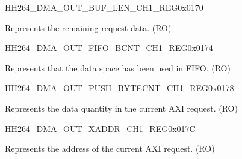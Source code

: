     \begin{register}{H}{H264\_DMA\_OUT\_BUF\_LEN\_CH1\_REG}{0x0170}\label{regdesc:H264DMAOUTBUFLENCH1REG}
    \regnewline%
    \begin{regdesc}\begin{reglist}
    \label{fielddesc:H264DMAOUTCMDFIFOBUFLENHBCH1}\item [H264\_DMA\_OUT\_CMDFIFO\_BUF\_LEN\_HB\_CH1] Represents the remaining request data. (RO)
    \end{reglist}\end{regdesc}
    \end{register}
    
    
    \begin{register}{H}{H264\_DMA\_OUT\_FIFO\_BCNT\_CH1\_REG}{0x0174}\label{regdesc:H264DMAOUTFIFOBCNTCH1REG}
    \regnewline%
    \begin{regdesc}\begin{reglist}
    \label{fielddesc:H264DMAOUTCMDFIFOOUTFIFOBCNTCH1}\item [H264\_DMA\_OUT\_CMDFIFO\_OUTFIFO\_BCNT\_CH1] Represents that the data space has been used in FIFO. (RO)
    \end{reglist}\end{regdesc}
    \end{register}
    
    
    \begin{register}{H}{H264\_DMA\_OUT\_PUSH\_BYTECNT\_CH1\_REG}{0x0178}\label{regdesc:H264DMAOUTPUSHBYTECNTCH1REG}
    \regnewline%
    \begin{regdesc}\begin{reglist}
    \label{fielddesc:H264DMAOUTCMDFIFOPUSHBYTECNTCH1}\item [H264\_DMA\_OUT\_CMDFIFO\_PUSH\_BYTECNT\_CH1] Represents the data quantity in the current AXI request. (RO)
    \end{reglist}\end{regdesc}
    \end{register}
    
    
    \begin{register}{H}{H264\_DMA\_OUT\_XADDR\_CH1\_REG}{0x017C}\label{regdesc:H264DMAOUTXADDRCH1REG}
    \regnewline%
    \begin{regdesc}\begin{reglist}
    \label{fielddesc:H264DMAOUTCMDFIFOXADDRCH1}\item [H264\_DMA\_OUT\_CMDFIFO\_XADDR\_CH1] Represents the address of the current AXI request. (RO)
    \end{reglist}\end{regdesc}
    \end{register}
    
